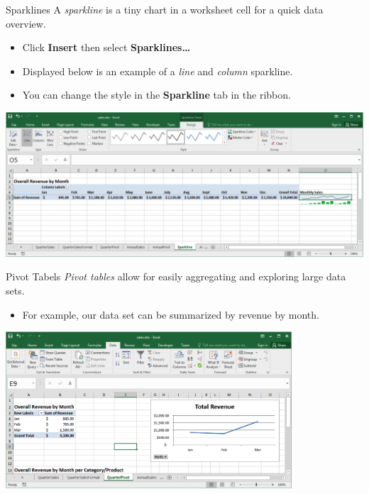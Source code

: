 \documentclass[xcolor=svgnames, handout]{beamer}
\begin{document}
\begin{frame}{Sparklines}
A \emph{sparkline} is a tiny chart in a worksheet cell for a quick data overview.
\begin{itemize}
\item Click {\bf Insert} then select {\bf Sparklines\dots} 
\item Displayed below is an example of a \textit{line} and \textit{column} sparkline.
\item You can change the style in the {\bf Sparkline} tab in the ribbon.
\end{itemize}
 \begin{center}
        \includegraphics[width=.9\textwidth]{Sparklines}
 \end{center}
\end{frame}





\begin{frame}{Pivot Tabels}
\emph{Pivot tables} allow for easily aggregating and exploring large data sets.\\[1em]
\begin{itemize}
\item For example, our data set can be summarized by revenue by month.
\end{itemize}
\begin{center}
\includegraphics[width=0.8\textwidth]{pivot}
\end{center}
\end{frame}
\end{document}
